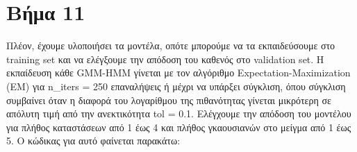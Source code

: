 \section*{Βήμα 11}

Πλέον, έχουμε υλοποιήσει τα μοντέλα, οπότε μπορούμε να τα εκπαιδεύσουμε στο training set και να ελέγξουμε την απόδοση του καθενός στο validation set. Η εκπαίδευση κάθε GMM-HMM γίνεται με τον αλγόριθμο Expectation-Maximization (EM) για n\_iters = 250 επαναλήψεις ή μέχρι να υπάρξει σύγκλιση, όπου σύγκλιση συμβαίνει όταν η διαφορά του λογαρίθμου της πιθανότητας γίνεται μικρότερη σε απόλυτη τιμή από την ανεκτικότητα tol = 0.1. Ελέγχουμε την απόδοση του μοντέλου για πλήθος καταστάσεων από 1 έως 4 και πλήθος γκαουσιανών στο μείγμα από 1 έως 5. Ο κώδικας για αυτό φαίνεται παρακάτω:

